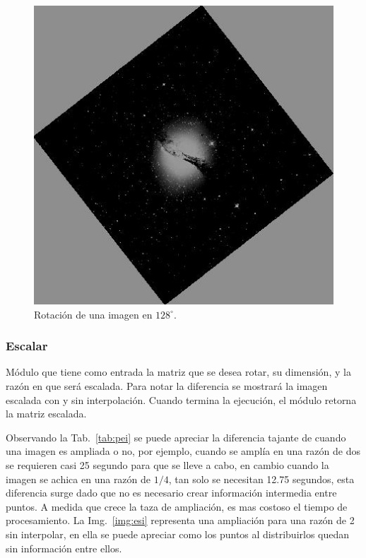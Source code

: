 \begin{figure}[ht!]
	\centering
	\includegraphics[scale=.5]{img/rot128}
	\caption{Rotación de una imagen en $128^\circ$.}
	\label{img:rot128}
\end{figure}



\subsubsection{Escalar}

Módulo que tiene como entrada la matriz que se desea rotar, su dimensión, y la razón en que será escalada. Para notar la diferencia se mostrará la imagen escalada con y sin interpolación. Cuando termina la ejecución, el módulo retorna la matriz escalada.

Observando la Tab.~\ref{tab:pei} se puede apreciar la diferencia tajante de cuando una imagen es ampliada o no, por ejemplo, cuando se amplía en una razón de dos se requieren casi 25 segundo para que se lleve a cabo, en cambio cuando la imagen se achica en una razón de $1/4$, tan solo se necesitan 12.75 segundos, esta diferencia surge dado que no es necesario crear información intermedia entre puntos. A medida que crece la taza de ampliación, es mas costoso el tiempo de procesamiento. La Img.~\ref{img:esi} representa una ampliación para una razón de 2 sin interpolar, en ella se puede apreciar como los puntos al distribuirlos quedan sin información entre ellos.

